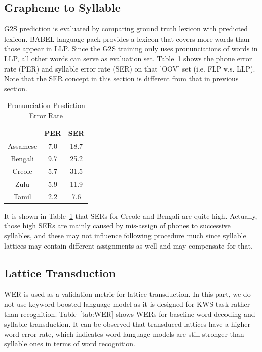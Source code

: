 \documentclass[journal]{IEEEtran}
\begin{document}
\subsection{Grapheme to Syllable}
G2S prediction is evaluated by comparing ground truth lexicon with predicted lexicon. BABEL language 
pack provides a lexicon that covers more words than those appear in LLP. Since the G2S training only 
uses pronunciations of words in LLP, all other words can serve as evaluation set. Table~\ref{tab:g2s} 
shows the phone error rate (PER) and syllable error rate (SER) on that 'OOV' set (i.e. FLP v.s. LLP). Note 
that the SER concept in this section is different from that in previous section.

\begin{table}[h]
  \caption{Pronunciation Prediction Error Rate}
  \label{tab:g2s}
  \centering
  \begin{tabular}{ccc}
    \hline
                  & PER & SER \\
    \hline
    Assamese      & 7.0 & 18.7 \\
    Bengali       & 9.7 & 25.2 \\
    Creole        & 5.7 & 31.5 \\
    Zulu          & 5.9 & 11.9 \\
    Tamil         & 2.2 & 7.6 \\
    \hline
  \end{tabular}
\end{table}

It is shown in Table~\ref{tab:g2s} that SERs for Creole and Bengali are quite high. Actually, those high
SERs are mainly caused by mis-assign of phones to successive syllables, and these may not influence following 
procedure much since syllable lattices may contain different assignments as well and may compensate for that.

\subsection{Lattice Transduction}
WER is used as a validation metric for lattice transduction. In this part, we do not use keyword boosted language 
model as it is designed for KWS task rather than recognition. Table~\ref{tab:WER} shows WERs for baseline word 
decoding and syllable transduction. It can be observed that transduced lattices have a higher word error 
rate, which indicates word language models are still stronger than syllable ones in terms of word recognition.
\end{document}
